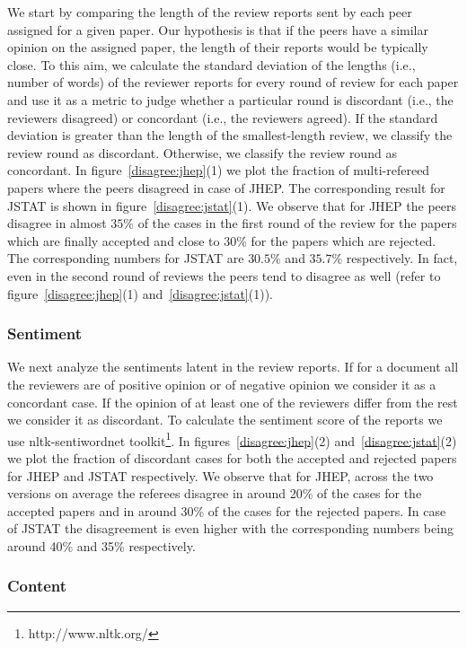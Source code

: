 We start by comparing the length of the review reports sent by each peer assigned for a given paper. Our hypothesis is that if the peers have a similar 
opinion on the assigned paper, the length of their reports would be typically close. To this aim, we calculate the standard deviation of the lengths 
(i.e., number of words) of the reviewer reports for every round of review for each paper and use it as a metric to judge whether a particular round is discordant 
(i.e., the reviewers disagreed) or concordant (i.e., the reviewers agreed). If the standard deviation is greater than the length of the smallest-length review, 
we classify the review round as discordant. Otherwise, we classify the review round as concordant.
In figure~\ref{disagree:jhep}(1) we plot the fraction of multi-refereed papers where the peers disagreed in case of JHEP. The corresponding result for 
JSTAT is shown in figure~\ref{disagree:jstat}(1). We observe that for JHEP the peers disagree in almost $35\%$ of the cases in the first round of the review 
for the papers which are finally accepted and close to $30\%$ for the papers which are rejected. The corresponding numbers for JSTAT are $30.5\%$ and $35.7\%$ 
respectively. In fact, even in the second round of reviews the peers tend to disagree as well (refer to figure~\ref{disagree:jhep}(1) and~\ref{disagree:jstat}(1)).

\subsubsection{Sentiment}

We next analyze the sentiments latent in the review reports. If for a document all the reviewers are of positive opinion or of negative opinion we 
consider it as a concordant case. If the opinion of at least one of the reviewers differ from the rest we consider it as discordant. 
To calculate the sentiment score of the reports we use nltk-sentiwordnet toolkit\footnote{http://www.nltk.org/}. In figures~\ref{disagree:jhep}(2) and~\ref{disagree:jstat}(2) 
we plot the fraction of discordant cases for both the accepted and rejected papers for JHEP and JSTAT respectively. We observe that for JHEP, across the two versions on average 
the referees 
disagree in around 20\% of the cases for the accepted papers and in around 30\% of the cases for the rejected papers. In case of JSTAT the disagreement is even higher 
with the corresponding numbers being around 40\% and 35\% respectively. 


\subsubsection{Content}

